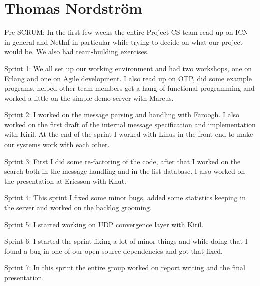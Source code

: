 \section{Thomas Nordstr\"om}

Pre-SCRUM:
In the first few weeks the entire Project CS team read up on ICN in general and NetInf in particular while trying to decide on what our project would be. We also had team-building exercises.

Sprint 1:
We all set up our working environment and had two workshops, one on Erlang and one on Agile development. I also read up on OTP, did some example programs, helped other team members get a hang of functional programming and worked a little on the simple demo server with Marcus.

Sprint 2:
I worked on the message parsing and handling with Faroogh. I also worked on the first draft of the internal message specification and implementation with Kiril. At the end of the sprint I worked with Linus in the front end to make our systems work with each other.

Sprint 3:
First I did some re-factoring of the code, after that I worked on the search both in the message handling and in the list database. I also worked on the presentation at Ericsson with Knut.

Sprint 4:
This sprint I fixed some minor bugs, added some statistics keeping in the server and worked on the backlog grooming.

Sprint 5:
I started working on UDP convergence layer with Kiril.

Sprint 6:
I started the sprint fixing a lot of minor things and while doing that I found a bug in one of our open source  dependencies and got that fixed.

Sprint 7:
In this sprint the entire group worked on report writing and the final presentation.
